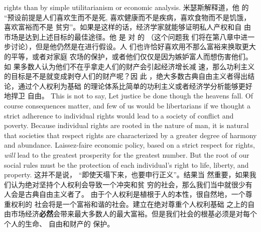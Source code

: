 \begin{paracol}{2}
rights than by simple utilitarianism or economic analysis.
\switchcolumn
米瑟斯解释道，他 的 “预设前提是人们喜欢生而不是死,
喜欢健康而不是疾病，喜欢食物而不是饥饿，喜欢富裕而不是
贫穷”。如果是这样的话，经济学家就能够证明私人产权和自
由市场是达到上述目标的最佳途径。他 是 对 的 （这个问题我
们将在第八章中进一步讨论），但是他仍然是在进行假设。人
们也许恰好喜欢用不那么富裕来换取更大的平等，或者对家庭
农场的保护，或者他们仅仅是因为嫉妒富人而想伤害他们。如
果多数人认为他们不在乎拿走人们的财产会引起经济增长减
速，那么功利主义的目标是不是就变成剥夺人们的财产呢？因
此 ，绝大多数古典自由主义者得出结论，通过个人权利为基础
的理论体系比简单的功利主义或者经济学分析能够更好地捍卫
自由。
\switchcolumn*
This is not to say, Let justice be done though the heavens fall.
Of course consequences matter, and few of us would be libertarians if we thought a strict adherence to individual rights would
lead to a society of conflict and poverty. Because individual
rights are rooted in the nature of man, it is natural that societies
that respect rights are characterized by a greater degree of harmony and abundance. Laissez-faire economic policy, based on a
strict respect for rights, \textit{will} lead to the greatest prosperity for
the greatest number. But the root of our social rules must be
the protection of each individual's right to life, liberty, and
property.
\switchcolumn
这并不是说， “即使天塌下来，也要申行正义”。结果当
然重要，如果我们认为绝对坚持个人权利会导致一个冲突和贫
穷的社会，那么我们当中就很少有人会是古典自由主义者了。
由于个人权利是植根于人的本性，很自然地，一个尊重权利的
社会将是一个富裕和谐的社会。建立在绝对尊重个人权利基础
之上的自由市场经济\textbf{必然}会带来最大多数人的最大富裕。但是我们社会的根基必须是对每个个人的生命、 自由和财产的
保护。



\end{paracol}
